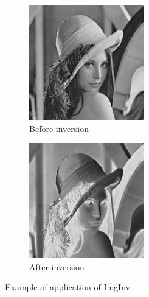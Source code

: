 \documentclass[main.tex]{subfiles}
\begin{document}
\begin{figure}
    \centering
    \begin{subfigure}[b]{0.45\linewidth}
        \centering
        \includegraphics[width=5cm]{imgs/png/implemExecModel_ImgInv_LennaNormal.png}
        \caption{Before inversion}
        \label{fig_implemExecModel_ImgInv_LennaNormal}
    \end{subfigure}\hspace{6mm}
    \begin{subfigure}[b]{0.45\linewidth}
    \centering
        \includegraphics[width=5cm]{imgs/png/implemExecModel_ImgInv_LennaInverted.png}
        \caption{After inversion}
        \label{fig_implemExecModel_ImgInv_LennaNormal}
    \end{subfigure}
    \caption{Example of application of ImgInv}
    \label{fig_implemExecModel_ImgInv_Lenna}
\end{figure}
\end{document}
